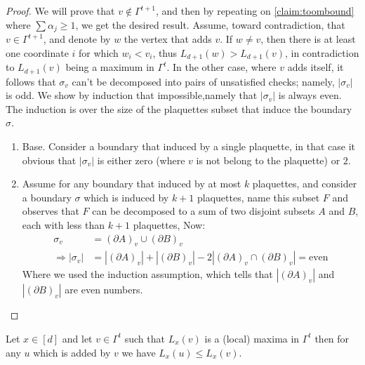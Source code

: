 \begin{proof}
  We will prove that $v \notin \Gamma^{t+1}$, and then by repeating on \cref{claim:toombound} where $\sum{\alpha_{j}} \ge 1$, we get the desired result. Assume, toward contradiction, that $v \in \Gamma^{t+1}$, and denote by $w$ the vertex that adds $v$. If $w \neq v$, then there is at least one coordinate $i$ for which $w_{i} < v_{i}$, thus $L_{d+1}(w) > L_{d+1}(v)$, in contradiction to $L_{d+1}(v)$ being a maximum in $\Gamma^{t}$. In the other case, where $v$ adds itself, it follows that $\sigma_{v}$ can't be decomposed into pairs of unsatisfied checks; namely, $|\sigma_{v}|$ is odd. We show by induction that impossible,namely that $|\sigma_{v}|$ is always even. The induction is over the size of the plaquettes subset that induce the boundary $\sigma$.
  \begin{enumerate}
    \item Base. Consider a boundary that induced by a single plaquette, in that case it obvious that  $|\sigma_{v}|$ is either zero (where $v$ is not belong to the plaquette) or $2$. 
    \item Assume for any boundary that induced by at most $k$ plaquettes, and consider a boundary $\sigma$ which is induced by $k+1$ plaquettes, name this subset $F$ and observes that $F$ can be decomposed to a sum of two disjoint subsets $A$ and $B$, each with less than $k+1$ plaquettes, Now: 
      \begin{equation*}
        \begin{split}
          \sigma_{v} &= \left(\partial A \right)_{v} \cup \left(\partial B \right)_{v} \\
          \Rightarrow |\sigma_{v}| &=   | \left(\partial A \right)_{v} | + | \left(\partial B \right)_{v} | - 2 |\left(\partial A \right)_{v} \cap \left(\partial B \right)_{v}|  = \text{even} 
        \end{split}
      \end{equation*}
      Where we used the induction assumption, which tells that $| \left(\partial A \right)_{v} |$ and $| \left(\partial B \right)_{v} |$ are even numbers.
  \end{enumerate}


\end{proof}

\begin{claim}
  \label{claim:toomc}
  Let $x \in [d]$ and let $v \in \Gamma^{t}$ such that $L_{x}(v)$ is a (local) maxima in $\Gamma^{t}$ then for any $u$ which is added by $v$ we have $L_{x}(u) \le L_{x}(v)$. 
\end{claim}

